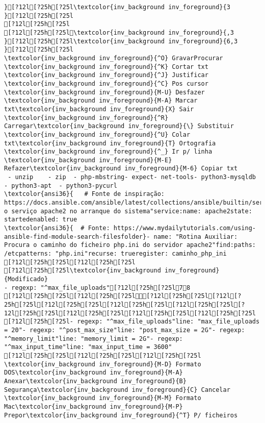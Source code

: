\documentclass{scrartcl}
\begin{document}
\begin{Verbatim}
}[?12l[?25h[?25l\textcolor{inv_background inv_foreground}{3
}[?12l[?25h[?25l
[?12l[?25h[?25l
[?12l[?25h[?25l\textcolor{inv_background inv_foreground}{,3 
}[?12l[?25h[?25l\textcolor{inv_background inv_foreground}{6,3
}[?12l[?25h[?25l
\textcolor{inv_background inv_foreground}{^O} GravarProcurar      \textcolor{inv_background inv_foreground}{^K} Cortar txt    \textcolor{inv_background inv_foreground}{^J} Justificar    \textcolor{inv_background inv_foreground}{^C} Pos cursor    \textcolor{inv_background inv_foreground}{M-U} Desfazer     \textcolor{inv_background inv_foreground}{M-A} Marcar txt\textcolor{inv_background inv_foreground}{X} Sair    \textcolor{inv_background inv_foreground}{^R} Carregar\textcolor{inv_background inv_foreground}{\} Substituir    \textcolor{inv_background inv_foreground}{^U} Colar txt\textcolor{inv_background inv_foreground}{T} Ortografia    \textcolor{inv_background inv_foreground}{^_} Ir p/ linha   \textcolor{inv_background inv_foreground}{M-E} Refazer\textcolor{inv_background inv_foreground}{M-6} Copiar txt
 - unzip    - zip  - php-mbstring- expect- net-tools- python3-mysqldb    - python3-apt  - python3-pycurl
\textcolor{ansi36}{   # Fonte de inspiração: https://docs.ansible.com/ansible/latest/collections/ansible/builtin/service_module.html} o serviço apache2 no arranque do sistema"service:name: apache2state: startedenabled: true
\textcolor{ansi36}{  # Fonte: https://www.mydailytutorials.com/using-ansible-find-module-search-filesfolder}- name: "Rotina Auxiliar: Procura o caminho do ficheiro php.ini do servidor apache2"find:paths: /etcpatterns: "php.ini"recurse: trueregister: caminho_php_ini
[?12l[?25h[?25l[?12l[?25h[?25l
[?12l[?25h[?25l\textcolor{inv_background inv_foreground}{Modificado}
- regexp: "^max_file_uploads"[?12l[?25h[?25l78
[?12l[?25h[?25l[?12l[?25h[?25l[?12l[?25h[?25l[?12l[?25h[?25l[?12l[?25h[?25l[?12l[?25h[?25l[?12l[?25h[?25l[?12l[?25h[?25l[?12l[?25h[?25l[?12l[?25h[?25l[?12l[?25h[?25l
[?12l[?25h[?25l- regexp: "^max_file_uploads"line: "max_file_uploads = 20"- regexp: "^post_max_size"line: "post_max_size = 2G"- regexp: "^memory_limit"line: "memory_limit = 2G"- regexp: "^max_input_time"line: "max_input_time = 3600"
[?12l[?25h[?25l[?12l[?25h[?25l[?12l[?25h[?25l         \textcolor{inv_background inv_foreground}{M-D} Formato DOS\textcolor{inv_background inv_foreground}{M-A} Anexar\textcolor{inv_background inv_foreground}{B} Segurança\textcolor{inv_background inv_foreground}{C} Cancelar           \textcolor{inv_background inv_foreground}{M-M} Formato Mac\textcolor{inv_background inv_foreground}{M-P} Prepor\textcolor{inv_background inv_foreground}{^T} P/ ficheiros

\end{Verbatim}
\end{document}

